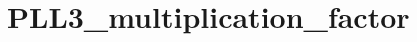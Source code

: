 \hypertarget{group___p_l_l3__multiplication__factor}{\section{P\-L\-L3\-\_\-multiplication\-\_\-factor}
\label{group___p_l_l3__multiplication__factor}
}
